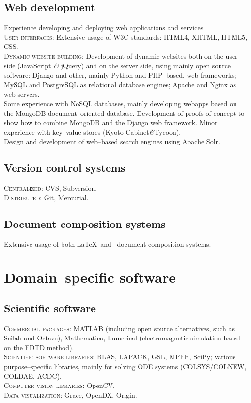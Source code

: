\documentclass[11pt, a4paper]{article}
\newcommand{\amper}
           {{\fontspec[Scale=.95]
                      {Adobe Caslon Pro}\selectfont\itshape\&}}
\begin{document}
\subsection*{Web development}
\noindent
	Experience developing and deploying web applications and services.\\
	\textsc{User interfaces}: Extensive usage of W3C standards: HTML4, XHTML, HTML5, CSS.\\
	\textsc{Dynamic website building}: Development of dynamic websites both on the user side (JavaScript \amper{} jQuery) and on the server side, using mainly open source software: Django and other, mainly Python and PHP--based, web frameworks; MySQL and PostgreSQL as relational database engines; Apache and Nginx as web servers.\\
	Some experience with NoSQL databases, mainly developing webapps based on the MongoDB document--oriented database. Development of proofs of concept to show how to combine MongoDB and the Django web framework. Minor experience with key--value stores (Kyoto Cabinet\amper{}Tycoon).\\
	Design and development of web--based search engines using Apache Solr.
\subsection*{Version control systems}
\noindent
	\textsc{Centralized}: CVS, Subversion.\\
	\textsc{Distributed}: Git, Mercurial.
\subsection*{Document composition systems}
\noindent
	Extensive usage of both \LaTeX\ and \XeTeX\ document composition systems.


\section*{Domain--specific software} %
\subsection*{Scientific software}
\noindent
	\textsc{Commercial packages}: MATLAB (including open source alternatives, such as Scilab and Octave), Mathematica, Lumerical (electromagnetic simulation based on the FDTD method).\\
	\textsc{Scientific software libraries}: BLAS, LAPACK, GSL, MPFR, SciPy; various purpose--specific libraries, mainly for solving ODE systems (COLSYS/COLNEW, COLDAE, ACDC).\\
	\textsc{Computer vision libraries}: OpenCV.\\
	\textsc{Data visualization}: Grace, OpenDX, Origin.
\end{document}
